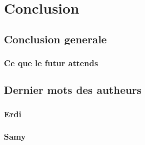 \chapter{Conclusion}
\section{Conclusion generale}
\subsection{Ce que le futur attends}
\section{Dernier mots des autheurs}
\subsection{Erdi}
\subsection{Samy}